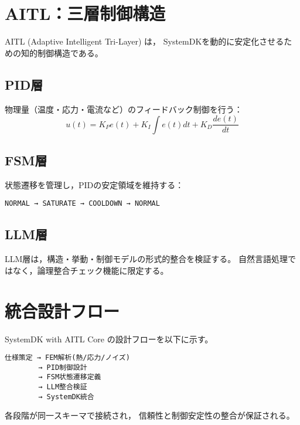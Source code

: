 \documentclass[conference]{IEEEtran}
\begin{document}
\begin{CJK}{UTF8}{min}
\section{AITL：三層制御構造}
AITL (Adaptive Intelligent Tri-Layer) は，
SystemDKを動的に安定化させるための知的制御構造である。

\subsection{PID層}
物理量（温度・応力・電流など）のフィードバック制御を行う：
\begin{equation}
u(t) = K_P e(t) + K_I \int e(t) dt + K_D \frac{de(t)}{dt}
\end{equation}

\subsection{FSM層}
状態遷移を管理し，PIDの安定領域を維持する：
\begin{center}
\texttt{NORMAL → SATURATE → COOLDOWN → NORMAL}
\end{center}

\subsection{LLM層}
LLM層は，構造・挙動・制御モデルの形式的整合を検証する。
自然言語処理ではなく，論理整合チェック機能に限定する。

\section{統合設計フロー}
SystemDK with AITL Core の設計フローを以下に示す。

\begin{verbatim}
仕様策定 → FEM解析(熱/応力/ノイズ)
        → PID制御設計
        → FSM状態遷移定義
        → LLM整合検証
        → SystemDK統合
\end{verbatim}

各段階が同一スキーマで接続され，
信頼性と制御安定性の整合が保証される。


\end{CJK}
\end{document}
